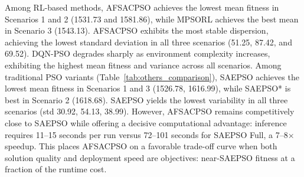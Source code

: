\documentclass[final,5p,times]{elsarticle}
\begin{document}
Among RL-based methods, AFSACPSO achieves the lowest mean fitness in Scenarios 1 and 2 (1531.73 and 1581.86), while MPSORL achieves the best mean in Scenario 3 (1543.13).
AFSACPSO exhibits the most stable dispersion, achieving the lowest standard deviation in all three scenarios (51.25, 87.42, and 69.52).
DQN-PSO degrades sharply as environment complexity increases, exhibiting the highest mean fitness and variance across all scenarios. Among traditional PSO variants (Table~\ref{tab:others_comparison}), SAEPSO achieves the lowest mean fitness in Scenarios 1 and 3 (1526.78, 1616.99), while SAEPSO* is best in Scenario 2 (1618.68).
SAEPSO yields the lowest variability in all three scenarios (std 30.92, 54.13, 38.99).
However, AFSACPSO remains competitively close to SAEPSO while offering a decisive computational advantage: inference requires 11--15 seconds per run versus 72--101 seconds for SAEPSO Full, a 7--8$\times$ speedup.
This places AFSACPSO on a favorable trade-off curve when both solution quality and deployment speed are objectives: near-SAEPSO fitness at a fraction of the runtime cost.
\end{document}
